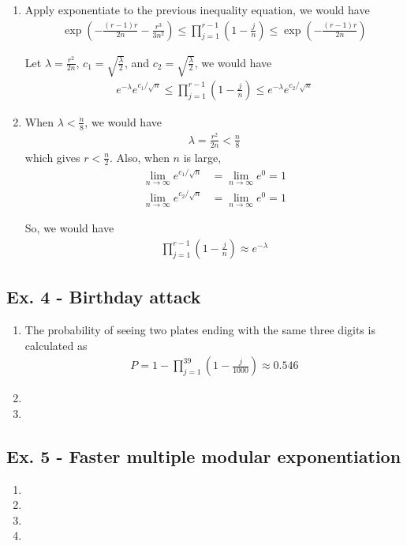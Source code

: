 \documentclass[11pt,a4paper]{article}
\begin{document}
\begin{enumerate}
\item Apply exponentiate to the previous inequality equation, we would have
	\begin{align*}
	\exp\left(-\frac{(r-1)r}{2n}-\frac{r^3}{3n^2}\right) \leq \prod_{j=1}^{r-1}\left(1-\frac{j}{n}\right) \leq \exp\left(-\frac{(r-1)r}{2n}\right)
	\end{align*}
\par Let $\lambda = \frac{r^2}{2n}$, $c_{1} = \sqrt{\frac{\lambda}{2}}$, and $c_{2} = \sqrt{\frac{\lambda}{2}}$, we would have
	\begin{align*}
	e^{-\lambda}e^{c_{1}/\sqrt{n}} \leq \prod_{j=1}^{r-1} \left(1-\frac{j}{n}\right) \leq e^{-\lambda}e^{c_{2}/\sqrt{n}}
	\end{align*}

\item When $\lambda < \frac{n}{8}$, we would have
	\begin{align*}
	\lambda = \frac{r^2}{2n} < \frac{n}{8}
	\end{align*}
which gives $r < \frac{n}{2}$. Also, when $n$ is large,
	\begin{align*}
	\lim_{n\to\infty}e^{c_1/\sqrt{n}} &= \lim_{n\to\infty}e^0 = 1 \\
	\lim_{n\to\infty}e^{c_2/\sqrt{n}} &= \lim_{n\to\infty}e^0=1
	\end{align*}
\par So, we would have
	\begin{align*}
	\prod_{j=1}^{r-1}\left(1-\frac{j}{n}\right) \approx e^{-\lambda}
	\end{align*}
\end{enumerate}



\subsection*{Ex. 4 - Birthday attack}
\begin{enumerate}
\item The probability of seeing two plates ending with the same three digits is calculated as
	\begin{align*}
	P = 1 - \prod_{j=1}^{39}\left(1 - \frac{j}{1000}\right) \approx 0.546
	\end{align*}

\item 

\item
\end{enumerate}



\subsection*{Ex. 5 - Faster multiple modular exponentiation}
\begin{enumerate}
\item

\item

\item

\item
\end{enumerate}
\end{document}
